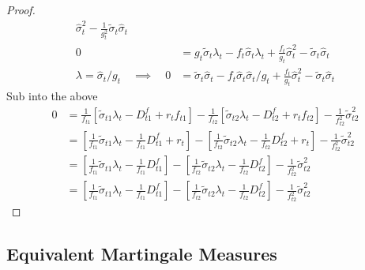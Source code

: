 \documentclass[12pt]{article}
\theoremstyle{plain}
\theoremstyle{definition}
\theoremstyle{remark}
\begin{document}
\begin{proof}
\begin{align*}
  \hat{\sigma}^2_t
  -
  \frac{1}{g_t^2}
  \tilde{\sigma}_t \hat{\sigma}_t
  \\
  0
  &=
  g_t
  \tilde{\sigma}_{t}\lambda_t
  -
  f_t
  \hat{\sigma}_{t}\lambda_t
  +
  \frac{f_t}{g_t}
  \hat{\sigma}^2_t
  -
  \tilde{\sigma}_t \hat{\sigma}_t
  \\
  \lambda=\hat{\sigma}_t/g_t
  \quad\implies\quad
  0
  &=
  \tilde{\sigma}_{t}
  \hat{\sigma}_t
  -
  f_t
  \hat{\sigma}_{t}
  \hat{\sigma}_t/g_t
  +
  \frac{f_t}{g_t}
  \hat{\sigma}^2_t
  -
  \tilde{\sigma}_t \hat{\sigma}_t
\end{align*}
Sub into the above
\begin{align*}
  0
  &=
  \frac{1}{f_{t1}}
  \left[
  \tilde{\sigma}_{t1}\lambda_t
  -D_{t1}^f
  + r_tf_{t1}
  \right]
  -
  \frac{1}{f_{t2}}
  \left[
  \tilde{\sigma}_{t2}\lambda_t
  -D_{t2}^f
  + r_tf_{t2}
  \right]
  -
  \frac{1}{f_{t2}^2}
  \tilde{\sigma}_{t2}^2
  \\
  &=
  \left[
  \frac{1}{f_{t1}}
  \tilde{\sigma}_{t1}\lambda_t
  -
  \frac{1}{f_{t1}}
  D_{t1}^f
  + r_t
  \right]
  -
  \left[
  \frac{1}{f_{t2}}
  \tilde{\sigma}_{t2}\lambda_t
  -
  \frac{1}{f_{t2}}
  D_{t2}^f
  + r_t
  \right]
  -
  \frac{1}{f_{t2}^2}
  \tilde{\sigma}_{t2}^2
  \\
  &=
  \left[
  \frac{1}{f_{t1}}
  \tilde{\sigma}_{t1}\lambda_t
  -
  \frac{1}{f_{t1}}
  D_{t1}^f
  \right]
  -
  \left[
  \frac{1}{f_{t2}}
  \tilde{\sigma}_{t2}\lambda_t
  -
  \frac{1}{f_{t2}}
  D_{t2}^f
  \right]
  -
  \frac{1}{f_{t2}^2}
  \tilde{\sigma}_{t2}^2
  \\
  &=
  \left[
  \frac{1}{f_{t1}}
  \tilde{\sigma}_{t1}\lambda_t
  -
  \frac{1}{f_{t1}}
  D_{t1}^f
  \right]
  -
  \left[
  \frac{1}{f_{t2}}
  \tilde{\sigma}_{t2}\lambda_t
  -
  \frac{1}{f_{t2}}
  D_{t2}^f
  \right]
  -
  \frac{1}{f_{t2}^2}
  \tilde{\sigma}_{t2}^2
\end{align*}
\end{proof}



\clearpage
\subsection{Equivalent Martingale Measures}
\end{document}
